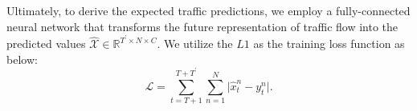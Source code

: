 Ultimately, to derive the expected traffic predictions, we employ a fully-connected neural network that transforms the future representation of traffic flow into the predicted values $\bm{\mathcal{\hat{X}}} \in \mathbb{R}^{T^\prime\times N\times C}$. We utilize the $L1$ as the training loss function as below:
\begin{equation}
    \mathcal{L} = \sum_{t=T+1}^{T+T^\prime}\sum_{n=1}^{N}\lvert{\hat{x}_{t}^{n}} - y_{t}^{n}\rvert.
    \label{eq:loss}
\end{equation}
